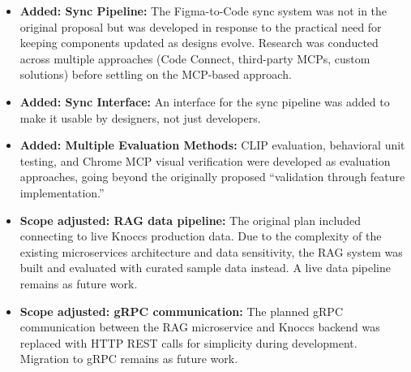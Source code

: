 \begin{itemize}
    \item \textbf{Added: Sync Pipeline:} The Figma-to-Code sync system was not in the original proposal but was developed in response to the practical need for keeping components updated as designs evolve. Research was conducted across multiple approaches (Code Connect, third-party MCPs, custom solutions) before settling on the MCP-based approach.    
    \item \textbf{Added: Sync Interface:} An interface for the sync pipeline was added to make it usable by designers, not just developers.
    \item \textbf{Added: Multiple Evaluation Methods:} CLIP evaluation, behavioral unit testing, and Chrome MCP visual verification were developed as evaluation approaches, going beyond the originally proposed ``validation through feature implementation.''    
    \item \textbf{Scope adjusted: RAG data pipeline:} The original plan included connecting to live Knoccs production data. Due to the complexity of the existing microservices architecture and data sensitivity, the RAG system was built and evaluated with curated sample data instead. A live data pipeline remains as future work.
    \item \textbf{Scope adjusted: gRPC communication:} The planned gRPC communication between the RAG microservice and Knoccs backend was replaced with HTTP REST calls for simplicity during development. Migration to gRPC remains as future work.
\end{itemize}
